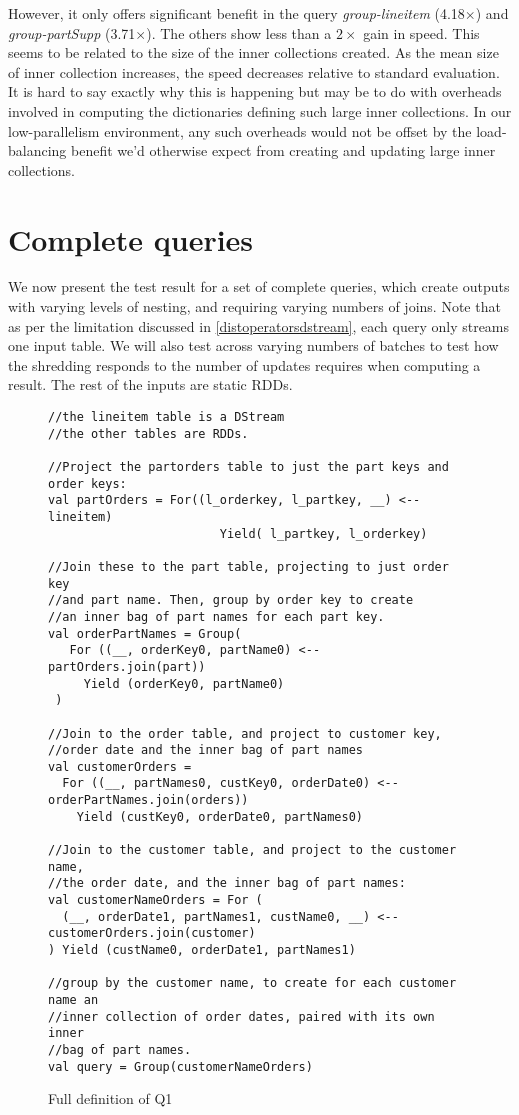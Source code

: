 However, it only offers significant benefit in the query \textit{group-lineitem} (4.18$\times$) and \textit{group-partSupp} (3.71$\times$). The others show less than a $2\times$ gain in speed. This seems to be related to the size of the inner collections created. As the mean size of inner collection increases, the speed decreases relative to standard evaluation. It is hard to say exactly why this is happening but may be to do with overheads involved in computing the dictionaries defining such large inner collections. In our low-parallelism environment, any such overheads would not be offset by the load-balancing benefit we'd otherwise expect from creating and updating large inner collections.

\section{Complete queries}

We now present the test result for a set of complete queries, which create outputs with varying levels of nesting, and requiring varying numbers of joins. Note that as per the limitation discussed in \ref{distoperatorsdstream}, each query only streams one input table. We will also test across varying numbers of batches to test how the shredding responds to the number of updates requires when computing a result. The rest of the inputs are static RDDs.
\begin{figure}
\begin{lstlisting}
//the lineitem table is a DStream
//the other tables are RDDs.

//Project the partorders table to just the part keys and order keys:
val partOrders = For((l_orderkey, l_partkey, __) <-- lineitem)
                        Yield( l_partkey, l_orderkey)

//Join these to the part table, projecting to just order key
//and part name. Then, group by order key to create 
//an inner bag of part names for each part key.
val orderPartNames = Group(
   For ((__, orderKey0, partName0) <-- partOrders.join(part))
     Yield (orderKey0, partName0)
 )

//Join to the order table, and project to customer key, 
//order date and the inner bag of part names
val customerOrders =
  For ((__, partNames0, custKey0, orderDate0) <-- orderPartNames.join(orders))
    Yield (custKey0, orderDate0, partNames0)

//Join to the customer table, and project to the customer name,
//the order date, and the inner bag of part names:
val customerNameOrders = For (
  (__, orderDate1, partNames1, custName0, __) <-- customerOrders.join(customer)
) Yield (custName0, orderDate1, partNames1)

//group by the customer name, to create for each customer name an 
//inner collection of order dates, paired with its own inner 
//bag of part names.
val query = Group(customerNameOrders)
\end{lstlisting}
\caption{Full definition of Q1}
\label{q1-def}
\end{figure}

